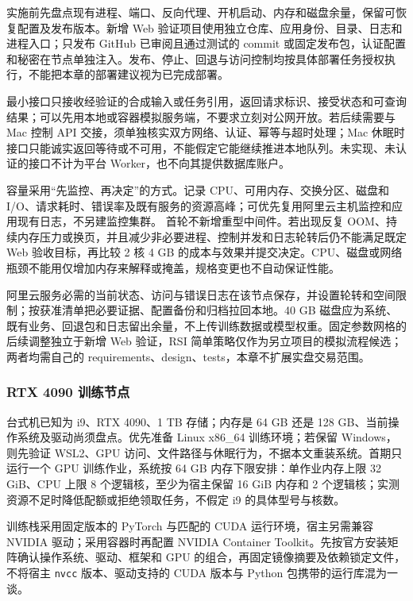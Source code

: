 \documentclass[11pt,a4paper]{article}
\begin{document}
实施前先盘点现有进程、端口、反向代理、开机启动、内存和磁盘余量，保留可恢复配置及发布版本。新增 Web 验证项目使用独立仓库、应用身份、目录、日志和进程入口；只发布 GitHub 已审阅且通过测试的 commit 或固定发布包，认证配置和秘密在节点单独注入。发布、停止、回退与访问控制均按具体部署任务授权执行，不能把本章的部署建议视为已完成部署。

最小接口只接收经验证的合成输入或任务引用，返回请求标识、接受状态和可查询结果；可以先用本地或容器模拟服务端，不要求立刻对公网开放。若后续需要与 Mac 控制 API 交接，须单独核实双方网络、认证、幂等与超时处理；Mac 休眠时接口只能诚实返回等待或不可用，不能假定它能继续推进本地队列。未实现、未认证的接口不计为平台 Worker，也不向其提供数据库账户。

容量采用“先监控、再决定”的方式。记录 CPU、可用内存、交换分区、磁盘和 I/O、请求耗时、错误率及既有服务的资源高峰；可优先复用阿里云主机监控和应用现有日志，不另建监控集群。\cite{ch5-aliyun-monitoring} 首轮不新增重型中间件。若出现反复 OOM、持续内存压力或换页，并且减少非必要进程、控制并发和日志轮转后仍不能满足既定 Web 验收目标，再比较 2 核 4 GB 的成本与效果并提交决定。CPU、磁盘或网络瓶颈不能用仅增加内存来解释或掩盖，规格变更也不自动保证性能。

阿里云服务必需的当前状态、访问与错误日志在该节点保存，并设置轮转和空间限制；按获准清单把必要证据、配置备份和归档拉回本地。40 GB 磁盘应为系统、既有业务、回退包和日志留出余量，不上传训练数据或模型权重。固定参数网格的后续调整独立于新增 Web 验证，RSI 简单策略仅作为另立项目的模拟流程候选；两者均需自己的 requirements、design、tests，本章不扩展实盘交易范围。

\subsubsection{RTX 4090 训练节点}

台式机已知为 i9、RTX 4090、1 TB 存储；内存是 64 GB 还是 128 GB、当前操作系统及驱动尚须盘点。优先准备 Linux x86\_64 训练环境；若保留 Windows，则先验证 WSL2、GPU 访问、文件路径与休眠行为，不据本文重装系统。首期只运行一个 GPU 训练作业，系统按 64 GB 内存下限安排：单作业内存上限 32 GiB、CPU 上限 8 个逻辑核，至少为宿主保留 16 GiB 内存和 2 个逻辑核；实测资源不足时降低配额或拒绝领取任务，不假定 i9 的具体型号与核数。

训练栈采用固定版本的 PyTorch 与匹配的 CUDA 运行环境，宿主另需兼容 NVIDIA 驱动；采用容器时再配置 NVIDIA Container Toolkit。先按官方安装矩阵确认操作系统、驱动、框架和 GPU 的组合，再固定镜像摘要及依赖锁定文件，不将宿主 \texttt{nvcc} 版本、驱动支持的 CUDA 版本与 Python 包携带的运行库混为一谈。\cite{ops-pytorch-install,ops-nvidia-container}
\end{document}
